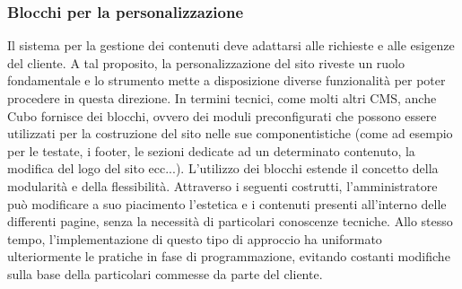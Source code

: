 \subsubsection{Blocchi per la personalizzazione}
Il sistema per la gestione dei contenuti deve adattarsi alle richieste e alle esigenze del cliente. A tal proposito, la personalizzazione del sito riveste un ruolo fondamentale e lo strumento mette a disposizione diverse funzionalità per poter procedere in questa direzione. In termini tecnici, come molti altri CMS, anche Cubo fornisce dei blocchi, ovvero dei moduli preconfigurati che possono essere utilizzati per la costruzione del sito nelle sue componentistiche (come ad esempio per le testate, i footer, le sezioni dedicate ad un determinato contenuto, la modifica del logo del sito ecc...).\hfill \break
L'utilizzo dei blocchi estende il concetto della modularità e della flessibilità. Attraverso i seguenti costrutti, l'amministratore può modificare a suo piacimento l'estetica e i contenuti presenti all'interno delle differenti pagine, senza la necessità di particolari conoscenze tecniche. Allo stesso tempo, l'implementazione di questo tipo di approccio ha uniformato ulteriormente le pratiche in fase di programmazione, evitando costanti modifiche sulla base della particolari commesse da parte del cliente.
